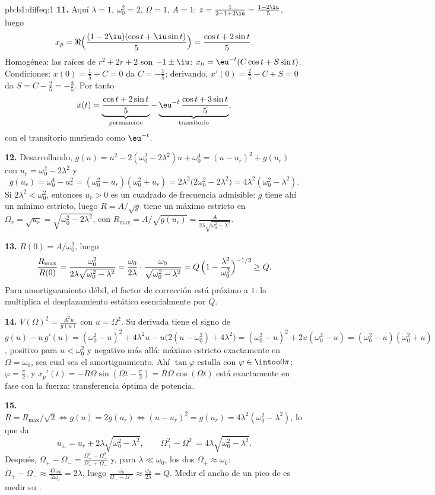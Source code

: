 \begin{solution}{pb:b1:diffeq:1}
\textbf{11.} Aquí $\lambda = 1$, $\omega_0^2 = 2$, $\Omega = 1$,
$A = 1$: $z = \frac1{2 - 1 + 2\iu} = \frac{1 - 2\iu}5$, luego
\[
x_p = \Re\Bigl(\frac{(1 - 2\iu)(\cos t + \iu\sin t)}5\Bigr)
= \frac{\cos t + 2\sin t}5 .
\]
Homogénea: las raíces de $r^2 + 2r + 2$ son $-1 \pm \iu$:
$x_h = \eu^{-t}(C\cos t + S\sin t)$. Condiciones:
$x(0) = \frac15 + C = 0$ da $C = -\frac15$; derivando,
$x'(0) = \frac25 - C + S = 0$ da $S = C - \frac25 = -\frac35$. Por tanto
\[
x(t) = \underbrace{\frac{\cos t + 2\sin t}5}_{\text{permanente}}
- \underbrace{\eu^{-t}\,\frac{\cos t + 3\sin
t}5}_{\text{transitorio}} ,
\]
con el transitorio muriendo como $\eu^{-t}$.

\textbf{12.} Desarrollando, $g(u) = u^2 - 2(\omega_0^2 - 2\lambda^2)u
+ \omega_0^4 = (u - u_r)^2 + g(u_r)$ con $u_r = \omega_0^2 -
2\lambda^2$ y
\[
g(u_r) = \omega_0^4 - u_r^2 = (\omega_0^2 - u_r)(\omega_0^2 +
u_r) = 2\lambda^2\bigl(2\omega_0^2 - 2\lambda^2\bigr) =
4\lambda^2(\omega_0^2 - \lambda^2) .
\]
Si $2\lambda^2 < \omega_0^2$, entonces $u_r > 0$ es un cuadrado de
frecuencia admisible: $g$ tiene ahí un mínimo estricto, luego
$R = A/\sqrt g$ tiene un máximo estricto en
$\Omega_r = \sqrt{u_r} = \sqrt{\omega_0^2 - 2\lambda^2}$, con
$R_{\max} = A/\sqrt{g(u_r)} = \frac{A}{2\lambda\sqrt{\omega_0^2 -
\lambda^2}}$.

\textbf{13.} $R(0) = A/\omega_0^2$, luego
\[
\frac{R_{\max}}{R(0)}
= \frac{\omega_0^2}{2\lambda\sqrt{\omega_0^2 - \lambda^2}}
= \frac{\omega_0}{2\lambda}\cdot
\frac{\omega_0}{\sqrt{\omega_0^2 - \lambda^2}}
= Q\,\Bigl(1 - \frac{\lambda^2}{\omega_0^2}\Bigr)^{-1/2}
\geq Q .
\]
Para amortiguamiento débil, el factor de corrección está próximo a $1$:
la  multiplica el desplazamiento estático esencialmente
por $Q$.

\textbf{14.} $V(\Omega)^2 = \frac{A^2 u}{g(u)}$ con $u = \Omega^2$. Su
derivada tiene el signo de $g(u) - u\,g'(u) = (\omega_0^2 - u)^2 +
4\lambda^2 u - u\bigl(2(u - \omega_0^2) + 4\lambda^2\bigr) =
(\omega_0^2 - u)^2 + 2u(\omega_0^2 - u) = (\omega_0^2 - u)(\omega_0^2 +
u)$, positivo para $u < \omega_0^2$ y negativo más allá: máximo
estricto exactamente en $\Omega = \omega_0$, sea cual sea el
amortiguamiento. Ahí $\tan\varphi$ estalla con $\varphi \in
\intoo0\pi$: $\varphi = \frac\pi2$, y $x_p'(t) = -R\Omega\sin(\Omega t
- \frac\pi2) = R\Omega\cos(\Omega t)$ está exactamente en fase con la
fuerza: transferencia óptima de potencia.

\textbf{15.} $R = R_{\max}/\sqrt2 \iff g(u) = 2g(u_r) \iff (u -
u_r)^2 = g(u_r) = 4\lambda^2(\omega_0^2 - \lambda^2)$, lo que da
\[
u_\pm = u_r \pm 2\lambda\sqrt{\omega_0^2 - \lambda^2},
\qquad
\Omega_+^2 - \Omega_-^2 = 4\lambda\sqrt{\omega_0^2 - \lambda^2} .
\]
Después, $\Omega_+ - \Omega_- = \frac{\Omega_+^2 -
\Omega_-^2}{\Omega_+ + \Omega_-}$ y, para $\lambda \ll \omega_0$, los
dos $\Omega_\pm \approx \omega_0$: $\Omega_+ - \Omega_- \approx
\frac{4\lambda\omega_0}{2\omega_0} = 2\lambda$, luego
$\frac{\omega_0}{\Omega_+ - \Omega_-} \approx
\frac{\omega_0}{2\lambda} = Q$. Medir el ancho de un pico de
 es medir su .


\end{solution}
